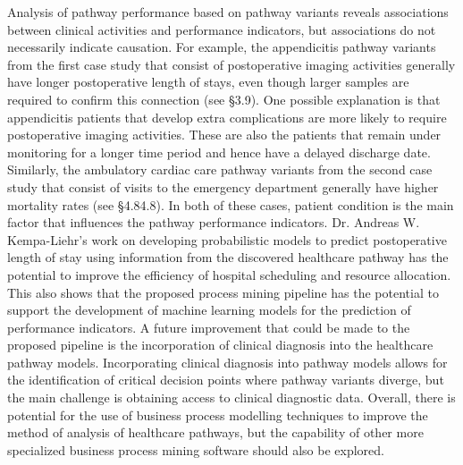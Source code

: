 Analysis of pathway performance based on pathway variants reveals associations between clinical activities and performance indicators, but associations do not necessarily indicate causation. For example, the appendicitis pathway variants from the first case study that consist of postoperative imaging activities generally have longer postoperative length of stays, even though larger samples are required to confirm this connection (see §3.9). One possible explanation is that appendicitis patients that develop extra complications are more likely to require postoperative imaging activities. These are also the patients that remain under monitoring for a longer time period and hence have a delayed discharge date. Similarly, the ambulatory cardiac care pathway variants from the second case study that consist of visits to the emergency department generally have higher mortality rates (see §4.84.8). In both of these cases, patient condition is the main factor that influences the pathway performance indicators.
Dr. Andreas W. Kempa-Liehr’s work on developing probabilistic models to predict postoperative length of stay using information from the discovered healthcare pathway has the potential to improve the efficiency of hospital scheduling and resource allocation. This also shows that the proposed process mining pipeline has the potential to support the development of machine learning models for the prediction of performance indicators. A future improvement that could be made to the proposed pipeline is the incorporation of clinical diagnosis into the healthcare pathway models. Incorporating clinical diagnosis into pathway models allows for the identification of critical decision points where pathway variants diverge, but the main challenge is obtaining access to clinical diagnostic data. Overall, there is potential for the use of business process modelling techniques to improve the method of analysis of healthcare pathways, but the capability of other more specialized business process mining software should also be explored.

